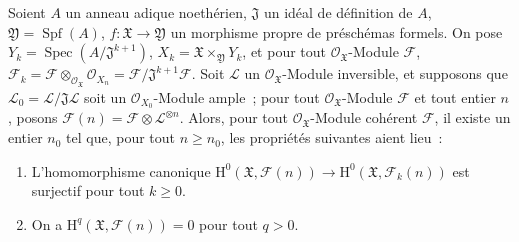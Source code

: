 \begin{proposition}[5.2.3]
\label{III.5.2.3-fr}
Soient $A$ un anneau adique noethérien, $\mathfrak J$ un idéal de définition de
$A$, $\mathfrak Y=\operatorname{Spf}(A)$,
$f:\mathfrak X\to\mathfrak Y$ un morphisme propre de préschémas formels. On pose
$Y_k=\operatorname{Spec}(A/\mathfrak J^{k+1})$,
$X_k=\mathfrak X\times_{\mathfrak Y}Y_k$, et pour tout
$\mathcal O_{\mathfrak X}$-Module $\mathcal F$,
$\mathcal F_k=\mathcal F\otimes_{\mathcal O_{\mathfrak X}}\mathcal O_{X_n}
=\mathcal F/\mathfrak J^{k+1}\mathcal F$.
Soit $\mathcal L$ un $\mathcal O_{\mathfrak X}$-Module inversible, et supposons que
$\mathcal L_0=\mathcal L/\mathfrak J\mathcal L$ soit un
$\mathcal O_{X_0}$-Module ample~; pour tout $\mathcal O_{\mathfrak X}$-Module
$\mathcal F$ et tout entier $n$, posons
$\mathcal F(n)=\mathcal F\otimes\mathcal L^{\otimes n}$. Alors, pour tout
$\mathcal O_{\mathfrak X}$-Module cohérent $\mathcal F$, il existe un entier $n_0$
tel que, pour tout $n\geq n_0$, les propriétés suivantes aient lieu~:
\begin{enumerate}
\item[\textup{(i)}] L'homomorphisme canonique
$\mathrm H^0(\mathfrak X,\mathcal F(n))\to
\mathrm H^0(\mathfrak X,\mathcal F_k(n))$ est surjectif pour tout $k\geq0$.
\item[\textup{(ii)}] On a $\mathrm H^q(\mathfrak X,\mathcal F(n))=0$ pour tout $q>0$.
\end{enumerate}
\end{proposition}

